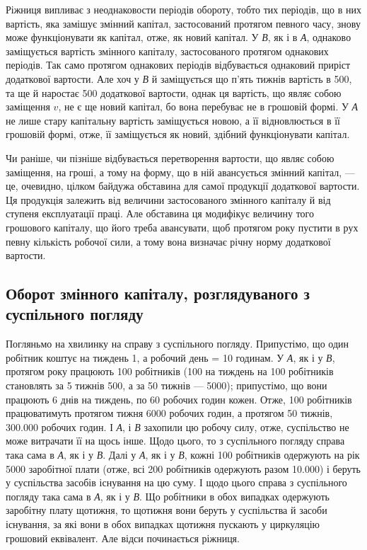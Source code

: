 Ріжниця випливає з неоднаковости періодів обороту, тобто тих періодів,
що в них вартість, яка замішує змінний капітал, застосований протягом
певного часу, знову може функціонувати як капітал, отже, як новий
капітал. У \emph{В}, як і в \emph{А}, однаково заміщується вартість змінного капіталу,
застосованого протягом однакових періодів. Так само протягом однакових
періодів відбувається однаковий приріст додаткової вартости. Але хоч у
\emph{В} й заміщується що п’ять тижнів вартість в 500, та ще й наростає
500 додаткової вартости, однак ця вартість, що являє собою
заміщення $v$, не є ще новий капітал, бо вона перебуває не в грошовій
формі. У \emph{А} не лише стару капітальну вартість заміщується новою, а її
відновлюється в її грошовій формі, отже, її заміщується як новий, здібний
функціонувати капітал.

Чи раніше, чи пізніше відбувається перетворення вартости, що являє
собою заміщення, на гроші, а тому на форму, що в ній авансується
змінний капітал, — це, очевидно, цілком байдужа обставина для самої
продукції додаткової вартости. Ця продукція залежить від величини застосованого
змінного капіталу й від ступеня експлуатації праці. Але обставина
ця модифікує величину того грошового капіталу, що його треба
авансувати, щоб протягом року пустити в рух певну кількість робочої
сили, а тому вона визначає річну норму додаткової вартости.

\subsection{Оборот змінного капіталу, розглядуваного з суспільного погляду}

Погляньмо на хвилинку на справу з суспільного погляду. Припустімо,
що один робітник коштує на тиждень 1, а робочий день = 10 годинам.
У \emph{А}, як і у \emph{В}, протягом року працюють 100 робітників (100 на тиждень на 100 робітників становлять за 5 тижнів 500, а
за 50 тижнів — 5000); припустімо, що вони працюють 6 днів на
тиждень, по 60 робочих годин кожен. Отже, 100 робітників працюватимуть
протягом тижня 6000 робочих годин, а протягом 50 тижнів, 300.000 робочих
годин. І \emph{А}, і \emph{В} захопили цю робочу силу, отже, суспільство не може витрачати
її на щось інше. Щодо цього, то з суспільного погляду справа
така сама в \emph{А}, як і у \emph{В}. Далі у \emph{А}, як і у \emph{В}, кожні 100 робітників одержують
на рік 5000 заробітної плати (отже, всі 200 робітників
одержують разом 10.000) і беруть у суспільства засобів існування
на цю суму. І щодо цього справа з суспільного погляду така сама в
\emph{А}, як і у \emph{В}. Що робітники в обох випадках одержують заробітну плату
щотижня, то щотижня вони беруть у суспільства й засоби існування, за
які вони в обох випадках щотижня пускають у циркуляцію грошовий
еквівалент. Але відси починається ріжниця.

